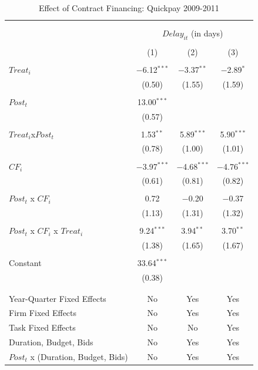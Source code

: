 \documentclass[
]{article}
\begin{document}
\begin{table}[H] \centering 
  \caption{Effect of Contract Financing: Quickpay 2009-2011} 
  \label{} 
\small 
\begin{tabular}{@{\extracolsep{-2pt}}lccc} 
\\[-1.8ex]\hline 
\hline \\[-1.8ex] 
\\[-1.8ex] & \multicolumn{3}{c}{$Delay_{it}$ (in days)} \\ 
\\[-1.8ex] & (1) & (2) & (3)\\ 
\hline \\[-1.8ex] 
 $Treat_i$ & $-$6.12$^{***}$ & $-$3.37$^{**}$ & $-$2.89$^{*}$ \\ 
  & (0.50) & (1.55) & (1.59) \\ 
  & & & \\ 
 $Post_t$ & 13.00$^{***}$ &  &  \\ 
  & (0.57) &  &  \\ 
  & & & \\ 
 $Treat_i$x$Post_t$ & 1.53$^{**}$ & 5.89$^{***}$ & 5.90$^{***}$ \\ 
  & (0.78) & (1.00) & (1.01) \\ 
  & & & \\ 
 $CF_i$ & $-$3.97$^{***}$ & $-$4.68$^{***}$ & $-$4.76$^{***}$ \\ 
  & (0.61) & (0.81) & (0.82) \\ 
  & & & \\ 
 $Post_t$ x $CF_i$ & 0.72 & $-$0.20 & $-$0.37 \\ 
  & (1.13) & (1.31) & (1.32) \\ 
  & & & \\ 
 $Post_t$ x $CF_i$ x $Treat_i$ & 9.24$^{***}$ & 3.94$^{**}$ & 3.70$^{**}$ \\ 
  & (1.38) & (1.65) & (1.67) \\ 
  & & & \\ 
 Constant & 33.64$^{***}$ &  &  \\ 
  & (0.38) &  &  \\ 
  & & & \\ 
\hline \\[-1.8ex] 
Year-Quarter Fixed Effects & No & Yes & Yes \\ 
Firm Fixed Effects & No & Yes & Yes \\ 
Task Fixed Effects & No & No & Yes \\ 
Duration, Budget, Bids & No & Yes & Yes \\ 
$Post_t$  x  (Duration, Budget, Bids) & No & Yes & Yes \\ 

\end{tabular}
\end{table}
\end{document}
